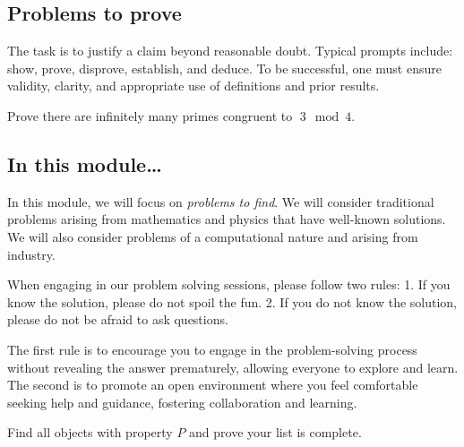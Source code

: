 \documentclass[
  a4paper,
  DIV=11,
  numbers=noendperiod,
  oneside]{scrreprt}
\begin{document}
\subsection{Problems to prove}\label{problems-to-prove}

The task is to justify a claim beyond reasonable doubt. Typical prompts
include: show, prove, disprove, establish, and deduce. To be successful,
one must ensure validity, clarity, and appropriate use of definitions
and prior results.

\begin{tcolorbox}[enhanced jigsaw, colframe=quarto-callout-note-color-frame, title=\textcolor{quarto-callout-note-color}{\faInfo}\hspace{0.5em}{Example of a problem to prove}, breakable, opacityback=0, titlerule=0mm, colbacktitle=quarto-callout-note-color!10!white, toptitle=1mm, colback=white, coltitle=black, toprule=.15mm, bottomtitle=1mm, left=2mm, arc=.35mm, rightrule=.15mm, bottomrule=.15mm, opacitybacktitle=0.6, leftrule=.75mm]

Prove there are infinitely many primes congruent to \(\;3\mod 4\).

\end{tcolorbox}

\subsection{In this module\ldots{}}\label{in-this-module}

In this module, we will focus on \emph{problems to find}. We will
consider traditional problems arising from mathematics and physics that
have well-known solutions. We will also consider problems of a
computational nature and arising from industry.

When engaging in our problem solving sessions, please follow two rules:
1. If you know the solution, please do not spoil the fun. 2. If you do
not know the solution, please do not be afraid to ask questions.

The first rule is to encourage you to engage in the problem-solving
process without revealing the answer prematurely, allowing everyone to
explore and learn. The second is to promote an open environment where
you feel comfortable seeking help and guidance, fostering collaboration
and learning.

\begin{tcolorbox}[enhanced jigsaw, colframe=quarto-callout-warning-color-frame, title=\textcolor{quarto-callout-warning-color}{\faExclamationTriangle}\hspace{0.5em}{Many problems mix both tasks!}, breakable, opacityback=0, titlerule=0mm, colbacktitle=quarto-callout-warning-color!10!white, toptitle=1mm, colback=white, coltitle=black, toprule=.15mm, bottomtitle=1mm, left=2mm, arc=.35mm, rightrule=.15mm, bottomrule=.15mm, opacitybacktitle=0.6, leftrule=.75mm]

Find all objects with property \(P\) and prove your list is complete.

\end{tcolorbox}
\end{document}
